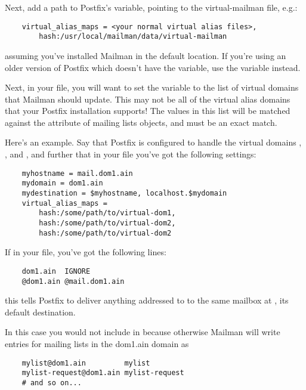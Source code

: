 \documentclass{howto}
\begin{document}
Next, add a path to Postfix's  variable, pointing to
the virtual-mailman file, e.g.:

\begin{verbatim}
    virtual_alias_maps = <your normal virtual alias files>,
        hash:/usr/local/mailman/data/virtual-mailman
\end{verbatim}

assuming you've installed Mailman in the default location.  If you're using an
older version of Postfix which doesn't have the 
variable, use the  variable instead.

Next, in your  file, you will want to set the variable
 to the list of virtual domains that Mailman
should update.  This may not be all of the virtual alias domains that your
Postfix installation supports!  The values in this list will be matched
against the  attribute of mailing lists objects, and must be an
exact match.

Here's an example.  Say that Postfix is configured to handle the virtual
domains , , and , and further
that in your  file you've got the following settings:

\begin{verbatim}
    myhostname = mail.dom1.ain
    mydomain = dom1.ain
    mydestination = $myhostname, localhost.$mydomain
    virtual_alias_maps =
        hash:/some/path/to/virtual-dom1,
        hash:/some/path/to/virtual-dom2,
        hash:/some/path/to/virtual-dom2
\end{verbatim}

If in your  file, you've got the following lines:

\begin{verbatim}
    dom1.ain  IGNORE
    @dom1.ain @mail.dom1.ain
\end{verbatim}

this tells Postfix to deliver anything addressed to  to the
same mailbox at , its default destination.

In this case you would not include  in
 because otherwise Mailman will write
entries for mailing lists in the dom1.ain domain as

\begin{verbatim}
    mylist@dom1.ain         mylist
    mylist-request@dom1.ain mylist-request
    # and so on...
\end{verbatim}
\end{document}
